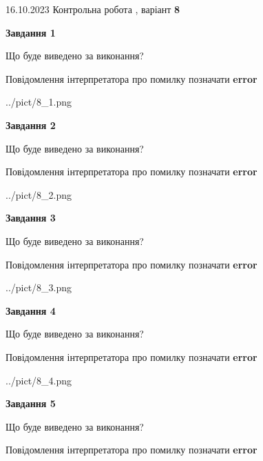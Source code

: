 \documentclass[12pt, ukrainian]{article}
\begin{document}
{\Large{16.10.2023 Контрольна робота , варіант  \No \textbf { 8 }\par}}
{
\begin {large}
{\begin {center}\textbf{Завдання 1}\end {center}}\par
Що буде виведено за виконання? \par
Повідомлення інтерпретатора про помилку позначати \textbf{error}

\begin{center}
	{../pict/8_1.png}
\end{center}
\newpage

{\begin {center}\textbf{Завдання 2}\end {center}}\par
Що буде виведено за виконання? \par
Повідомлення інтерпретатора про помилку позначати \textbf{error}

\begin{center}
	{../pict/8_2.png}
\end{center}
\newpage

{\begin {center}\textbf{Завдання 3}\end {center}}\par
Що буде виведено за виконання? \par
Повідомлення інтерпретатора про помилку позначати \textbf{error}

\begin{center}
	{../pict/8_3.png}
\end{center}
\newpage

{\begin {center}\textbf{Завдання 4}\end {center}}\par
Що буде виведено за виконання? \par
Повідомлення інтерпретатора про помилку позначати \textbf{error}

\begin{center}
	{../pict/8_4.png}
\end{center}
\newpage

{\begin {center}\textbf{Завдання 5}\end {center}}\par
Що буде виведено за виконання? \par
Повідомлення інтерпретатора про помилку позначати \textbf{error}


\end{large}}
\end{document}
